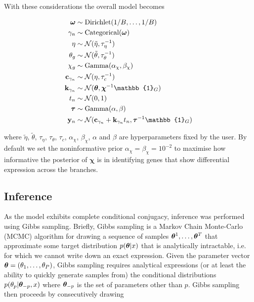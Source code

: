 With these considerations the overall model becomes

\begin{equation} \label{eq:mfamodel}
\begin{aligned}
\bm \omega & \sim \text{Dirichlet}(1 / B, \ldots, 1 / B) \\
\gamma_n & \sim \text{Categorical}(\bm \omega) \\
\eta & \sim \norm(\tilde{\eta}, \tau_\eta^{-1}) \\
\theta_g & \sim \norm(\tilde{\theta}, \tau_\theta^{-1}) \\
\chi_g & \sim \mathrm{Gamma}(\alpha_\chi, \beta_\chi) \\
\cgi & \sim \norm(\eta, \tau_c^{-1}) \\
\kgi & \sim \norm(\bm \theta, \bm \chi^{-1} \mathbb{1}_G) \\
t_n & \sim \norm(0, 1) \\
\btau & \sim \mathrm{Gamma}(\alpha, \beta) \\
\by_n & \sim \norm(\cgi + \kgi t_n, \btau^{-1} \mathbb{1}_G)
\end{aligned}
\end{equation}

where $\tilde{\eta}$, $\tilde{\theta}$, $\tau_\eta$, $\tau_\theta$, $\tau_c$, $\alpha_\chi$, $\beta_\chi$, $\alpha$ and $\beta$ are hyperparameters fixed by the user. By default we set the noninformative prior $\alpha_\chi = \beta_\chi = 10^{-2}$ to maximise how informative the posterior of $\bm \chi$ is in identifying genes that show differential expression across the branches.

\subsection{Inference} \label{sec:gibbs}

As the model exhibits complete conditional conjugacy, inference was performed using Gibbs sampling. Briefly, Gibbs sampling is a Markov Chain Monte-Carlo (MCMC) algorithm for drawing a sequence of samples ${\bm \theta}^1, \ldots, \bm \theta^T$ that approximate some target distribution $p({\bm \theta} | x)$ that is analytically intractable, i.e. for which we cannot write down an exact expression. Given the parameter vector ${\bm \theta} = (\theta_1, \ldots, \theta_P)$, Gibbs sampling requires analytical expressions (or at least the ability to quickly generate samples from) the conditional distributions $p(\theta_p | {\bm \theta}_{-p}, x)$ where ${\bm \theta}_{-p}$ is the set of parameters other than $p$. Gibbs sampling then proceeds by consecutively drawing

